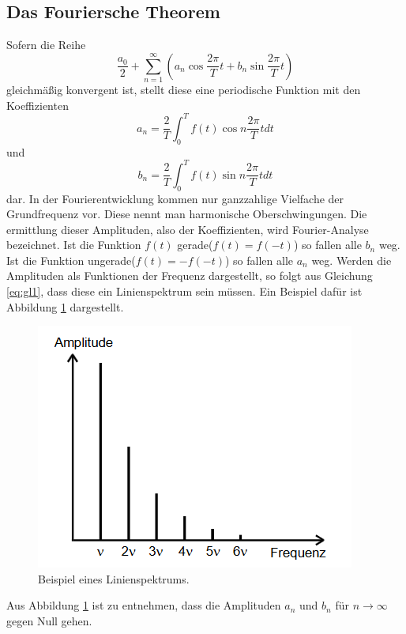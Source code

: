 \subsection{Das Fouriersche Theorem}
Sofern die Reihe
\begin{equation}
  \label{eq:gl1}
  \frac{a_0}{2}+\sum_{n=1}^\infty{(a_n\cos{\frac{2\pi}{T}t}+b_n\sin{\frac{2\pi}{T}t})}
\end{equation}
gleichmäßig konvergent ist, stellt diese eine periodische Funktion mit den Koeffizienten
\begin{equation}
    \label{eq:cos}
  a_n=\frac{2}{T}\int_0^T f(t)\cos{n\frac{2\pi}{T}t}dt
\end{equation}
und
\begin{equation}
    \label{eq:sin}
  b_n=\frac{2}{T}\int_0^T f(t)\sin{n\frac{2\pi}{T}t}dt
\end{equation}
dar.
In der Fourierentwicklung kommen nur ganzzahlige Vielfache der Grundfrequenz vor.
Diese nennt man harmonische Oberschwingungen.
Die ermittlung dieser Amplituden, also der Koeffizienten, wird Fourier-Analyse bezeichnet.
Ist die Funktion $f(t)$ gerade($f(t)=f(-t)$) so fallen alle $b_n$ weg.
Ist die Funktion ungerade($f(t)=-f(-t)$) so fallen alle $a_n$ weg.
Werden die Amplituden als Funktionen der Frequenz dargestellt, so folgt aus Gleichung \eqref{eq:gl1}, dass diese ein Linienspektrum sein müssen.
Ein Beispiel dafür ist Abbildung \ref{fig:lspek} dargestellt.
\begin{figure}[H]
    \centering
    \caption{Beispiel eines Linienspektrums.\cite{v351}}
    \label{fig:lspek}
    \includegraphics[width=\textwidth-20em]{content/lspek.png}
\end{figure}
\noindent
Aus Abbildung \ref{fig:lspek} ist zu entnehmen, dass die Amplituden $a_n$ und $b_n$ für $n\rightarrow\infty$ gegen Null gehen.


